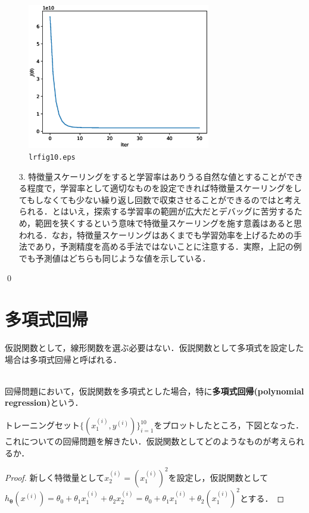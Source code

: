 \begin{ans}
\begin{cod}[\texttt{lr13.py}]
\begin{lstlisting}
\end{lstlisting}
\begin{figure}[H]
\begin{center}
\framed
\includegraphics[width=8cm]{code/lrfig10.eps}
\vspace{-10pt}
\caption{\texttt{lrfig10.eps}}
\endframed
\end{center}
\end{figure}
\end{cod}
\begin{enumerate}
\item[3.] 特徴量スケーリングをすると学習率はありうる自然な値とすることができる程度で，学習率として適切なものを設定できれば特徴量スケーリングをしてもしなくても少ない繰り返し回数で収束させることができるのではと考えられる．とはいえ，探索する学習率の範囲が広大だとデバッグに苦労するため，範囲を狭くするという意味で特徴量スケーリングを施す意義はあると思われる．なお，特徴量スケーリングはあくまでも学習効率を上げるための手法であり，予測精度を高める手法ではないことに注意する．実際，上記の例でも予測値はどちらも同じような値を示している．
\end{enumerate}
\qed
\end{ans}

\section{多項式回帰}

仮説関数として，線形関数を選ぶ必要はない．仮説関数として多項式を設定した場合は多項式回帰と呼ばれる．
\begin{defi}[多項式回帰]
　\\
回帰問題において，仮説関数を多項式とした場合，特に{\bf 多項式回帰(polynomial regression)}という．
\end{defi}

\begin{qu}
トレーニングセット$\{(x_1^{(i)},y^{(i)})\}_{i=1}^10$をプロットしたところ，下図となった．これについての回帰問題を解きたい．仮説関数としてどのようなものが考えられるか．

\end{qu}
\begin{proof}
新しく特徴量として$x_2^{(i)}=(x_1^{(i)})^2$を設定し，仮説関数として$h_{{\bm \theta}}(x^{(i)})=\theta_0+\theta_1 x_1^{(i)}+\theta_2 x_2^{(i)}=\theta_0+\theta_1 x_1^{(i)}+\theta_2 (x_1^{(i)})^2$とする．
\end{proof}


